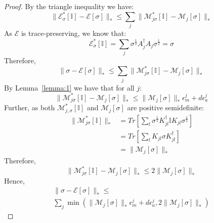 \documentclass[aps,floatfix,10pt,amssymb,amsfont,amsmath,superscriptaddress,float,nofootinbib,longbibliography,nobalancelastpage,twocolumn]{revtex4-2}
\newtheorem{theorem}{Theorem}
\begin{document}
\begin{proof}
    By the triangle inequality we have:
    \begin{equation}
        \|\mathcal{E}^*_{\sigma}[\mathbb{I}]-\mathcal{E}[\sigma]\|_* \leq \sum_j \|\mathcal{M}^*_{j\sigma}[\mathbb{I}]-\mathcal{M}_{j}[\sigma]\|_*
    \end{equation}
    As $\mathcal{E}$ is trace-preserving, we know that:
    \begin{equation}
        \mathcal{E}^*_{\sigma}[\mathbb{I}] = \sum_{j} \sigma^{\frac{1}{2}}A^{\dagger}_{j} A_{j}\sigma^{\frac{1}{2}} = \sigma
    \end{equation}
    Therefore,
    \begin{equation}
        \|\sigma - \mathcal{E}[\sigma]\|_* \leq \sum_j \|\mathcal{M}^*_{j\sigma}[\mathbb{I}]-\mathcal{M}_{j}[\sigma]\|_*
    \end{equation}
    By Lemma~\ref{lemma:1} we have that for all $j$:
    \begin{equation}
        \|\mathcal{M}^*_{j\sigma}[\mathbb{I}]-\mathcal{M}_{j}[\sigma]\|_* \leq \|\mathcal{M}_j[\sigma]\|_*\epsilon^j_m + d\epsilon^j_a
    \end{equation}
    Further, as both
$\mathcal{M}_{j,\sigma}^{*}[\mathbb{I}]$ and
$\mathcal{M}_j[\sigma]$ are positive semidefinite:
    \begin{align}
        \|\mathcal{M}^*_{j\sigma}[\mathbb{I}]\|_* &= Tr\left[\sum_l \sigma^{\frac{1}{2}} K_{jl}^{\dagger} \mathbb{I} K_{jl} \sigma^{\frac{1}{2}}\right]\\
        &= Tr\left[\sum_l K_{jl}\sigma K_{jl}^{\dagger}\right]\\
        &= \|\mathcal{M}_{j}[\sigma]\|_*
    \end{align}
    Therefore,
    \begin{equation}
         \|\mathcal{M}^*_{j\sigma}[\mathbb{I}]-\mathcal{M}_{j}[\sigma]\|_* \leq 2\|\mathcal{M}_{j}[\sigma]\|_*
    \end{equation}
    Hence,
    \begin{multline}
        \|\sigma-\mathcal{E}[\sigma]\|_* \leq \\\sum_j \min \left(\|\mathcal{M}_j[\sigma]\|_*\epsilon^j_m + d\epsilon^j_a, 2\|\mathcal{M}_{j}[\sigma]\|_*\right)
    \end{multline}
\end{proof}
\end{document}
